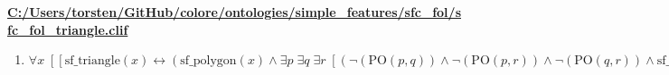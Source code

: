\documentclass{article}
\begin{document}
\textbf{\url{C:/Users/torsten/GitHub/colore/ontologies/simple\_features/sfc\_fol/sfc\_fol\_triangle.clif}}

\begin{enumerate}
\item $\forall x\;  \left[ \left[ \textrm{sf\_triangle}(x) \leftrightarrow \left(\textrm{sf\_polygon}(x) \land \exists p\; \exists q\; \exists r\;  \left[ \left(\neg \left(\textrm{PO}(p,q)\right) \land \neg \left(\textrm{PO}(p,r)\right) \land \neg \left(\textrm{PO}(q,r)\right) \land \textrm{sf\_line}(p) \land \textrm{sf\_line}(q) \land \textrm{sf\_line}(r) \land \textrm{BCont}(p,x) \land \textrm{BCont}(q,x) \land \textrm{BCont}(r,x) \land \forall s\;  \left[ \left[ \left(\textrm{sf\_line}(s) \land \textrm{BCont}(s,x)\right) \rightarrow \left(\textrm{=}(s,p) \lor \textrm{=}(s,q) \lor \textrm{=}(s,r)\right) \right] \right]\right) \right]\right) \right] \right]$
\end{enumerate}
\end{document}
